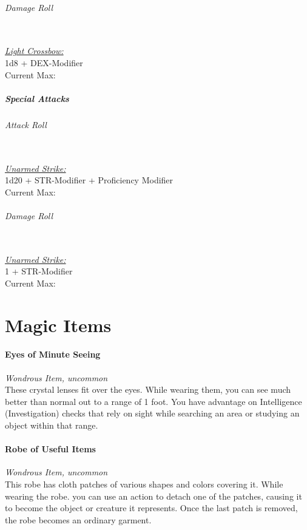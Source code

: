 \documentclass[letterpaper,openany,oneside,twocolumn]{book}
\newcommand{\PATH}{../../../}
\begin{document}
\paragraph*{Damage Roll}\hfill\\
\underline{\textit{Light Crossbow:}}\\
1d8 + DEX-Modifier\\
\indent Current Max: 
\subsubsection*{Special Attacks}
\paragraph*{Attack Roll}\hfill\\
\underline{\textit{Unarmed Strike:}}\\
1d20 + STR-Modifier + Proficiency Modifier\\
\indent Current Max: 
\paragraph*{Damage Roll}\hfill\\
\underline{\textit{Unarmed Strike:}}\\
1 + STR-Modifier\\
\indent Current Max: 

\part*{Magic Items}


\newpage
\subsection*{Eyes of Minute Seeing}
\textit{Wondrous Item, uncommon}\\
These crystal lenses fit over the eyes. While wearing them, you can see much better than normal out to a range of 1 foot. You have advantage on Intelligence (Investigation) checks that rely on sight while searching an area or studying an object within that range.
\subsection*{Robe of Useful Items}
\textit{Wondrous Item, uncommon}\\
This robe has cloth patches of various shapes and colors covering it. While wearing the robe. you can use an action to detach one of the patches, causing it to become the object or creature it represents. Once the last patch is removed, the robe becomes an ordinary garment.
\end{document}
